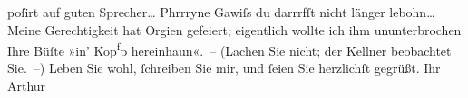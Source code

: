 \begin{ledgroupsized}[t]{13cm}
               poſirt auf guten Sprecher{\dots}\pend
           \pstart
           Phrrryne{\dotstwo}\pend
           \pstart
           Gawiſs {\dotstwo} du darrrfſt nicht länger lebohn{\dots}\pend
           \pstart
           Meine Gerechtigkeit hat Orgien {\pb}gefeiert; eigentlich
               wollte ich ihm ununterbrochen Ihre Büſte »in’  Kop\substVorne{}\textsuperscript{f}\substDazwischen{}p\substHinten{} hereinhaun«. – (Lachen Sie nicht; der Kellner beobachtet Sie. –)\pend
           \pstart
           Leben Sie wohl, ſchreiben Sie mir, und ſeien Sie herzlichſt gegrüßt.\pend
           \pstart Ihr \spacefill\mbox{Arthur}\pend{}
         
         \endnumbering{}\end{ledgroupsized}  \newcommand{\dateiname}{L00376}\newcommand{\titel}{Arthur Schnitzler an Richard Beer-Hofmann, 5. 10. 1894}\newcommand{\editorInnen}{Martin Anton Müller und Gerd-Hermann Susen}
      